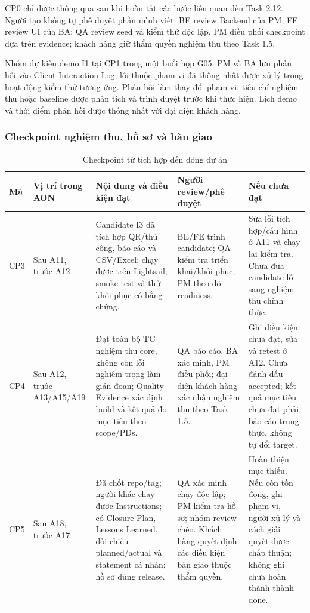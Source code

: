\documentclass{article}
\begin{document}
\begin{landscape}
\noindent CP0 chỉ được thông qua sau khi hoàn tất các bước liên quan đến Task 2.12. Người tạo không tự phê duyệt phần mình viết: BE review Backend của PM; FE review UI của BA; QA review seed và kiểm thử độc lập. PM điều phối checkpoint dựa trên evidence; khách hàng giữ thẩm quyền nghiệm thu theo Task 1.5.

\medskip
\noindent Nhóm dự kiến demo I1 tại CP1 trong một buổi họp G05. PM và BA lưu phản hồi vào Client Interaction Log; lỗi thuộc phạm vi đã thống nhất được xử lý trong hoạt động kiểm thử tương ứng. Phản hồi làm thay đổi phạm vi, tiêu chí nghiệm thu hoặc baseline được phân tích và trình duyệt trước khi thực hiện. Lịch demo và thời điểm phản hồi được thống nhất với đại diện khách hàng.
\newpage
\subsubsection{Checkpoint nghiệm thu, hồ sơ và bàn giao}
\begin{table}[H]
\centering
\caption{Checkpoint từ tích hợp đến đóng dự án}
\small
\renewcommand{\arraystretch}{1.3}
\begin{tabularx}{\linewidth}{|p{1cm}|p{3.1cm}|>{\raggedright\arraybackslash}X|p{5cm}|p{5.5cm}|}
\hline
\textbf{Mã} & \textbf{Vị trí trong AON} & \textbf{Nội dung và điều kiện đạt} & \textbf{Người review/phê duyệt} & \textbf{Nếu chưa đạt} \\ \hline
CP3 & Sau A11, trước A12 & Candidate I3 đã tích hợp QR/thủ công, báo cáo và CSV/Excel; chạy được trên Lightsail; smoke test và thử khôi phục có bằng chứng. & BE/FE trình candidate; QA kiểm tra triển khai/khôi phục; PM theo dõi readiness. & Sửa lỗi tích hợp/cấu hình ở A11 và chạy lại kiểm tra. Chưa đưa candidate lỗi sang nghiệm thu chính thức. \\ \hline
CP4 & Sau A12, trước A13/A15/A19 & Đạt toàn bộ TC nghiệm thu core, không còn lỗi nghiêm trọng làm gián đoạn; Quality Evidence xác định build và kết quả đo mục tiêu theo scope/PDs. & QA báo cáo, BA xác minh, PM điều phối; đại diện khách hàng xác nhận nghiệm thu theo Task 1.5. & Ghi điều kiện chưa đạt, sửa và retest ở A12. Chưa đánh dấu accepted; kết quả mục tiêu chưa đạt phải báo cáo trung thực, không tự đổi target. \\ \hline
CP5 & Sau A18, trước A17 & Đã chốt repo/tag; người khác chạy được Instructions; có Closure Plan, Lessons Learned, đối chiếu planned/actual và statement cá nhân; hồ sơ đúng release. & QA xác minh chạy độc lập; PM kiểm tra hồ sơ; nhóm review chéo. Khách hàng quyết định các điều kiện bàn giao thuộc thẩm quyền. & Hoàn thiện mục thiếu. Nếu còn tồn đọng, ghi phạm vi, người xử lý và cách giải quyết được chấp thuận; không ghi chưa hoàn thành thành done. \\ \hline

\end{tabularx}
\end{table}
\end{landscape}
\end{document}
